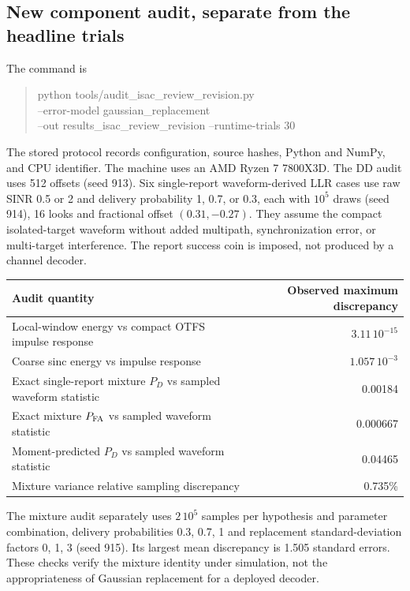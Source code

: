 \documentclass[10pt]{article}
\begin{document}
\subsection{New component audit, separate from the headline trials}
The command is
\begin{quote}\small\ttfamily
python tools/audit\_isac\_review\_revision.py\\
--error-model gaussian\_replacement\\
--out results\_isac\_review\_revision --runtime-trials 30
\end{quote}
The stored protocol records configuration, source hashes, Python and NumPy,
and CPU identifier. The machine uses an AMD Ryzen 7 7800X3D.
The DD audit uses 512 offsets (seed 913). Six single-report waveform-derived
LLR cases use raw SINR 0.5 or 2 and delivery probability 1, 0.7, or 0.3,
each with $10^5$ draws (seed 914), 16 looks and fractional offset
$(0.31,-0.27)$. They assume the compact isolated-target waveform without
added multipath, synchronization error, or multi-target interference.
The report success coin is imposed, not produced by a channel decoder.

\begin{center}
\begin{tabular}{lr}
\toprule
Audit quantity & Observed maximum discrepancy\\
\midrule
Local-window energy vs compact OTFS impulse response & $3.11\,10^{-15}$\\
Coarse sinc energy vs impulse response & $1.057\,10^{-3}$\\
Exact single-report mixture $P_D$ vs sampled waveform statistic & 0.00184\\
Exact mixture $P_{\rm FA}$ vs sampled waveform statistic & 0.000667\\
Moment-predicted $P_D$ vs sampled waveform statistic & 0.04465\\
Mixture variance relative sampling discrepancy & 0.735\%\\
\bottomrule
\end{tabular}
\end{center}

The mixture audit separately uses $2\,10^5$ samples per hypothesis and
parameter combination, delivery probabilities 0.3, 0.7, 1 and replacement
standard-deviation factors 0, 1, 3 (seed 915). Its largest mean discrepancy
is 1.505 standard errors. These checks verify the mixture identity under
simulation, not the appropriateness of Gaussian replacement for a deployed
decoder.
\end{document}
